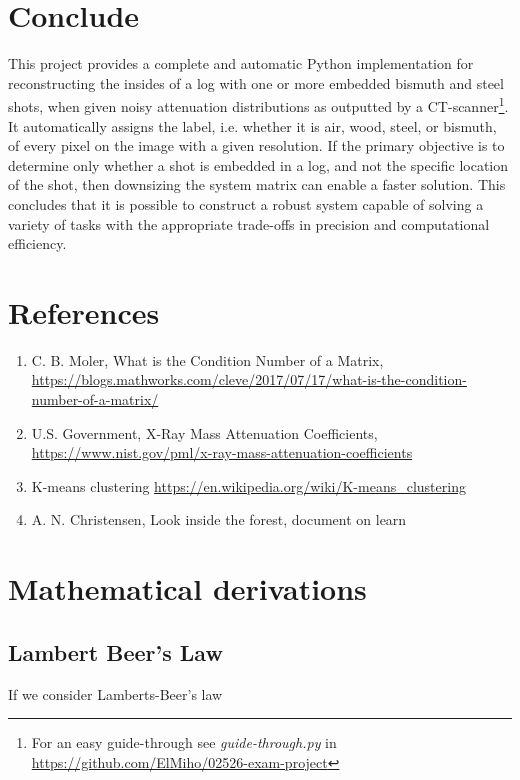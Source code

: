 \documentclass{article}
\begin{document}
\section{Conclude}
\vspace*{-0.3\baselineskip}
This project provides a complete and automatic Python implementation for reconstructing the insides of a log with one or more embedded bismuth and steel shots, when given noisy attenuation distributions as outputted by a CT-scanner\footnote[13]{For an easy guide-through see \textit{guide-through.py} in \url{https://github.com/ElMiho/02526-exam-project}}. It automatically assigns the label, i.e. whether it is air, wood, steel, or bismuth, of every pixel on the image with a given resolution. If the primary objective is to determine only whether a shot is embedded in a log, and not the specific location of the shot, then downsizing the system matrix can enable a faster solution. This concludes that it is possible to construct a robust system capable of solving a variety of tasks with the appropriate trade-offs in precision and computational efficiency.

\newpage
\section*{References}
\begin{enumerate}
    \item C. B. Moler, What is the Condition Number of a Matrix, \url{https://blogs.mathworks.com/cleve/2017/07/17/what-is-the-condition-number-of-a-matrix/}
    \item U.S. Government, X-Ray Mass Attenuation Coefficients, \\ \url{https://www.nist.gov/pml/x-ray-mass-attenuation-coefficients}
    \item K-means clustering \url{https://en.wikipedia.org/wiki/K-means_clustering}
    \item A. N. Christensen, Look inside the forest, document on learn
\end{enumerate}






\newpage
\appendix
\section{Mathematical derivations}
\subsection{Lambert Beer's Law}\label{appendix:lambert-beers-law}
If we consider Lamberts-Beer's law
\end{document}
